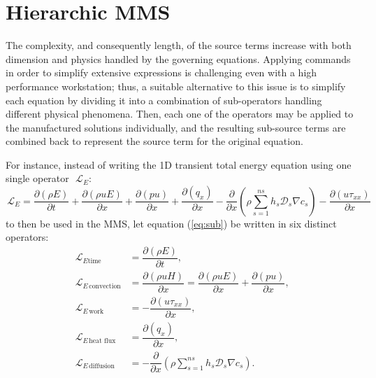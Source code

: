 \documentclass[10pt]{article}
\newcommand{\Diff}[2] {\dfrac{\partial( #1)}{\partial #2}}
\newcommand{\diff}[2] {\dfrac{\partial #1 }{\partial #2}}
\newcommand{\bv}[1]{\ensuremath{\mbox{\boldmath$ #1 $}}}
\newcommand{\Lo}{\,\mathcal{L}}
\newcommand{\convection}{\,\text{convection}}
\newcommand{\diffusion}{\,\text{diffusion}}
\newcommand{\work}{\,\text{work}}
\newcommand{\heatflux}{\,\text{heat flux}}
\begin{document}



\section{Hierarchic MMS}
The complexity, and consequently length, of the source terms increase with both dimension and physics handled by the governing equations. 
Applying commands in order to simplify extensive expressions is challenging even with a high performance workstation; thus, a suitable alternative to this issue is to simplify each equation by dividing it into a combination of sub-operators handling different physical phenomena. Then, each one of the operators may be applied to the manufactured solutions individually, and the resulting sub-source terms are combined back to represent the source term for the original equation.



For instance, instead of writing the 1D transient total energy equation using one single operator~$\Lo_E$:
\begin{equation}
 \label{eq:sub}
\Lo_E = \Diff{\rho E}{t} +\Diff{\rho uE}{x}+ \Diff{pu}{x}+ \Diff{q_x}{x}-\diff{ }{x}\left(\rho \sum_{s=1}^{ns} h_s \mathcal{D}_s \nabla c_s\right)-\Diff{u\tau_{xx}}{x} %
\end{equation}
to then be used in the MMS, let equation (\ref{eq:sub}) be written in six distinct operators:
\begin{equation}
 \begin{split}\label{sub01}
\Lo_{E \text{time}}&= \Diff{\rho E}{t} ,\\
\Lo_{E \convection} &= \Diff{\rho u H}{x} = \Diff{\rho uE}{x}+\Diff{pu}{x},\\
\Lo_{E \work} &= -\Diff{u\tau_{xx}}{x},\\
\Lo_{E \heatflux} &=\Diff{q_x}{x},\\ 
 \Lo_{E \diffusion}&= -\diff{ }{x}\left(\rho \sum_{s=1}^{ns} h_s \mathcal{D}_s \nabla c_s\right).
   \end{split}
\end{equation}
\end{document}
